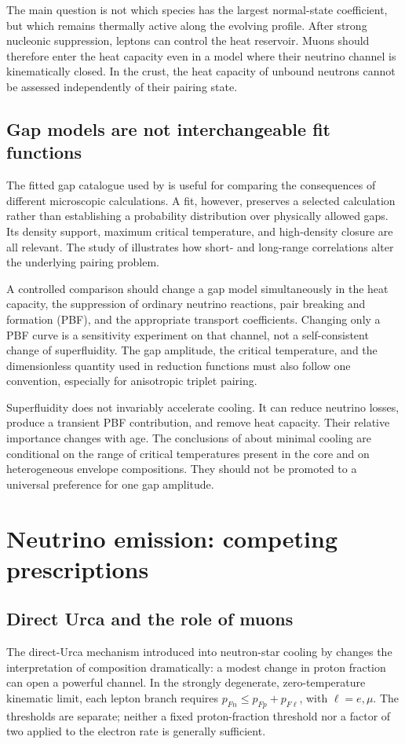 \documentclass{aa}
\begin{document}
The main question is not which species has the largest normal-state coefficient, but which remains thermally active along the evolving profile. After strong nucleonic suppression, leptons can control the heat reservoir. Muons should therefore enter the heat capacity even in a model where their neutrino channel is kinematically closed. In the crust, the heat capacity of unbound neutrons cannot be assessed independently of their pairing state.

\subsection{Gap models are not interchangeable fit functions}
The fitted gap catalogue used by \citet{Ho2015} is useful for comparing the consequences of different microscopic calculations. A fit, however, preserves a selected calculation rather than establishing a probability distribution over physically allowed gaps. Its density support, maximum critical temperature, and high-density closure are all relevant. The study of \citet{Ding2016} illustrates how short- and long-range correlations alter the underlying pairing problem.

A controlled comparison should change a gap model simultaneously in the heat capacity, the suppression of ordinary neutrino reactions, pair breaking and formation (PBF), and the appropriate transport coefficients. Changing only a PBF curve is a sensitivity experiment on that channel, not a self-consistent change of superfluidity. The gap amplitude, the critical temperature, and the dimensionless quantity used in reduction functions must also follow one convention, especially for anisotropic triplet pairing.

Superfluidity does not invariably accelerate cooling. It can reduce neutrino losses, produce a transient PBF contribution, and remove heat capacity. Their relative importance changes with age. The conclusions of \citet{Page2009} about minimal cooling are conditional on the range of critical temperatures present in the core and on heterogeneous envelope compositions. They should not be promoted to a universal preference for one gap amplitude.

\section{Neutrino emission: competing prescriptions}
\subsection{Direct Urca and the role of muons}
The direct-Urca mechanism introduced into neutron-star cooling by \citet{Lattimer1991} changes the interpretation of composition dramatically: a modest change in proton fraction can open a powerful channel. In the strongly degenerate, zero-temperature kinematic limit, each lepton branch requires $p_{Fn}\leq p_{Fp}+p_{F\ell}$, with $\ell=e,\mu$. The thresholds are separate; neither a fixed proton-fraction threshold nor a factor of two applied to the electron rate is generally sufficient.
\end{document}
